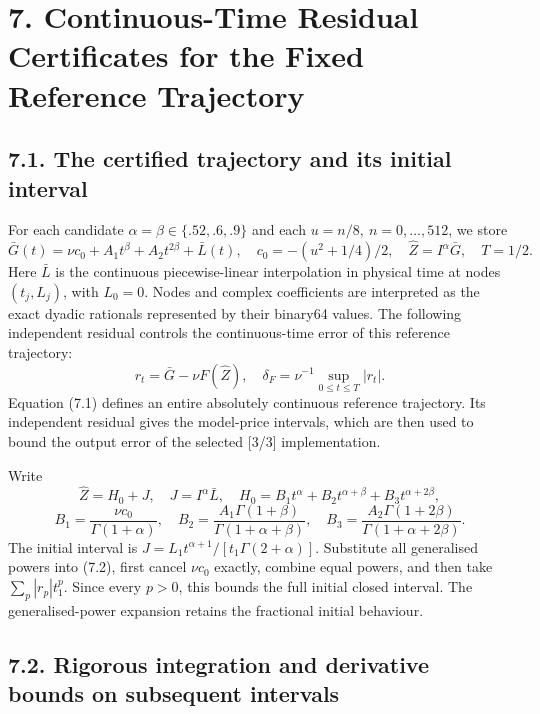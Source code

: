 \documentclass[a4paper,11pt]{article}
\begin{document}
\section*{7. Continuous-Time Residual Certificates for the Fixed Reference Trajectory}

\subsection*{7.1. The certified trajectory and its initial interval}

For each candidate \(\alpha=\beta\in\{.52,.6,.9\}\) and each \(u=n/8,\ n=0,\ldots,512\), we store
\[
\bar G(t)=\nu c_0+A_1t^\beta+A_2t^{2\beta}+\bar L(t),\quad
c_0=-(u^2+1/4)/2,\quad \widehat Z=I^\alpha\bar G,\quad T=1/2.
\tag{7.1}
\]
Here \(\bar L\) is the continuous piecewise-linear interpolation in physical time at nodes \((t_j,L_j)\), with \(L_0=0\). Nodes and complex coefficients are interpreted as the exact dyadic rationals represented by their binary64 values. The following independent residual controls the continuous-time error of this reference trajectory:
\[
r_t=\bar G-\nu F(\widehat Z),\quad
\delta_F=\nu^{-1}\sup_{0\le t\le T}|r_t|.
\tag{7.2}
\]
Equation (7.1) defines an entire absolutely continuous reference trajectory. Its independent residual gives the model-price intervals, which are then used to bound the output error of the selected [3/3] implementation.

Write
\[
\widehat Z=H_0+J,\quad J=I^\alpha\bar L,\quad
H_0=B_1t^\alpha+B_2t^{\alpha+\beta}+B_3t^{\alpha+2\beta},
\]
\[
B_1=\frac{\nu c_0}{\Gamma(1+\alpha)},\quad
B_2=\frac{A_1\Gamma(1+\beta)}{\Gamma(1+\alpha+\beta)},\quad
B_3=\frac{A_2\Gamma(1+2\beta)}{\Gamma(1+\alpha+2\beta)}.
\tag{7.3}
\]
The initial interval is \(J=L_1t^{\alpha+1}/[t_1\Gamma(2+\alpha)]\). Substitute all generalised powers into (7.2), first cancel \(\nu c_0\) exactly, combine equal powers, and then take \(\sum_p|r_p|t_1^p\). Since every \(p>0\), this bounds the full initial closed interval. The generalised-power expansion retains the fractional initial behaviour.

\subsection*{7.2. Rigorous integration and derivative bounds on subsequent intervals}
\end{document}

